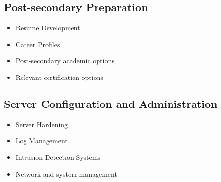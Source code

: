 \documentclass[letterpaper,10pt,english]{sphinxmanual}
\begin{document}
\subsection{Post-secondary Preparation}
\label{cybersecurity:post-secondary-preparation}\begin{itemize}
\item {} 
Resume Development

\item {} 
Career Profiles

\item {} 
Post-secondary academic options

\item {} 
Relevant certification options

\end{itemize}


\subsection{Server Configuration and Administration}
\label{cybersecurity:server-configuration-and-administration}\begin{itemize}
\item {} 
Server Hardening

\item {} 
Log Management

\item {} 
Intrusion Detection Systems

\item {} 
Network and system management

\end{itemize}
\end{document}
